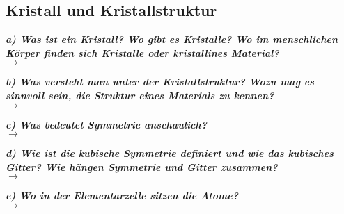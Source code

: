 \subsection{\label{subsec:FZV4}Kristall und Kristallstruktur}
\textbf{\textit{a) Was ist ein Kristall? Wo gibt es Kristalle? Wo im menschlichen Körper
finden sich Kristalle oder kristallines Material?}}\\
$\rightarrow$

\textbf{\textit{b) Was versteht man unter der Kristallstruktur? Wozu mag es sinnvoll sein,
die Struktur eines Materials zu kennen?}}\\
$\rightarrow$

\textbf{\textit{c) Was bedeutet Symmetrie anschaulich?}}\\
$\rightarrow$

\textbf{\textit{d) Wie ist die kubische Symmetrie definiert und wie das kubisches Gitter? Wie
hängen Symmetrie und Gitter zusammen?}}\\
$\rightarrow$

\textbf{\textit{e) Wo in der Elementarzelle sitzen die Atome?}}\\
$\rightarrow$